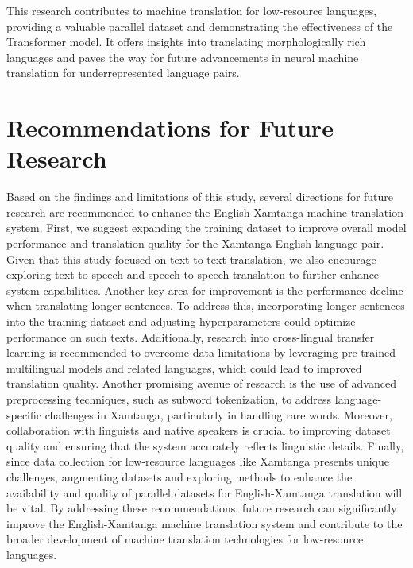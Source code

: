 This research contributes to machine translation for low-resource languages, providing a valuable parallel dataset and demonstrating the effectiveness of the Transformer model. It offers insights into translating morphologically rich languages and paves the way for future advancements in neural machine translation for underrepresented language pairs.
\section{Recommendations for Future Research}
Based on the findings and limitations of this study, several directions for future research are recommended to enhance the English-Xamtanga machine translation system. First, we suggest expanding the training dataset to improve overall model performance and translation quality for the Xamtanga-English language pair. Given that this study focused on text-to-text translation, we also encourage exploring text-to-speech and speech-to-speech translation to further enhance system capabilities. Another key area for improvement is the performance decline when translating longer sentences. To address this, incorporating longer sentences into the training dataset and adjusting hyperparameters could optimize performance on such texts. Additionally, research into cross-lingual transfer learning is recommended to overcome data limitations by leveraging pre-trained multilingual models and related languages, which could lead to improved translation quality. Another promising avenue of research is the use of advanced preprocessing techniques, such as subword tokenization, to address language-specific challenges in Xamtanga, particularly in handling rare words. Moreover, collaboration with linguists and native speakers is crucial to improving dataset quality and ensuring that the system accurately reflects linguistic details. Finally, since data collection for low-resource languages like Xamtanga presents unique challenges, augmenting datasets and exploring methods to enhance the availability and quality of parallel datasets for English-Xamtanga translation will be vital. By addressing these recommendations, future research can significantly improve the English-Xamtanga machine translation system and contribute to the broader development of machine translation technologies for low-resource languages.
